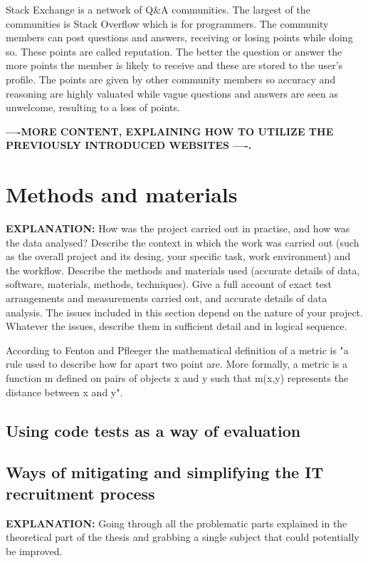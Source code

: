 \documentclass[11pt,a4paper,oneside,article]{memoir}
\begin{document}
Stack Exchange is a network of Q&A communities. The largest of the communities is Stack Overflow which is for programmers. The community members can post questions and answers, receiving or losing points while doing so. These points are called reputation. The better the question or answer the more points the member is likely to receive and these are stored to the user's profile. The points are given by other community members so accuracy and reasoning are highly valuated while vague questions and answers are seen as unwelcome, resulting to a loss of points.

\textbf{----MORE CONTENT, EXPLAINING HOW TO UTILIZE THE PREVIOUSLY INTRODUCED WEBSITES ----.}

\chapter{Methods and materials}
\textbf{EXPLANATION:} How was the project carried out in practise, and how was the data analysed? Describe the context in which the work was carried out (such as the overall project and its desing, your specific task, work environment) and the workflow. Describe the methods and materials used (accurate details of data, software, materials, methods, techniques). Give a full account of exact test arrangements and measurements carried out, and accurate details of data analysis. The issues included in this section depend on the nature of your project. Whatever the issues, describe them in sufficient detail and in logical sequence.

According to Fenton and Pfleeger \cite{fenton_pfleeger:book} the mathematical definition of a metric is "a rule
used to describe how far apart two point are. More formally, a metric is a function m defined
on pairs of objects x and y such that m(x,y) represents the distance between x and y".

\section{Using code tests as a way of evaluation}
\section{Ways of mitigating and simplifying the IT recruitment process}
\textbf{EXPLANATION:} Going through all the problematic parts explained in the theoretical part of the thesis and grabbing a single subject that could potentially be improved.
\end{document}

